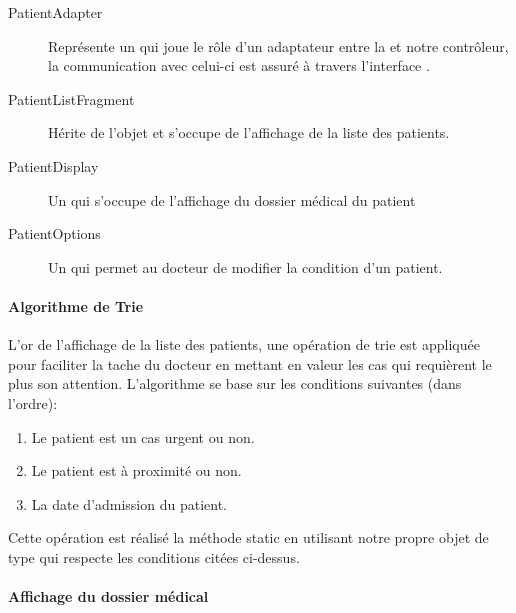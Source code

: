 \begin{description}

\item[PatientAdapter] Représente un  qui joue le rôle d'un adaptateur entre la  et notre contrôleur, la communication avec celui-ci est assuré à travers l'interface .

\item[PatientListFragment] Hérite de l'objet  et s'occupe de l'affichage de la liste des patients.

\item[PatientDisplay] Un  qui s'occupe de l'affichage du dossier médical du patient

\item[PatientOptions] Un  qui permet au docteur de modifier la condition d'un patient.

\end{description}

\paragraph{Algorithme de Trie}

L'or de l'affichage de la liste des patients, une opération de trie est appliquée pour faciliter la tache du docteur en mettant en valeur les cas qui requièrent le plus son attention.
L’algorithme se base sur les conditions suivantes (dans l'ordre):

\begin{enumerate}

\item Le patient est un cas urgent ou non.

\item Le patient est à proximité ou non.

\item La date d'admission du patient.

\end{enumerate}

Cette opération est réalisé la méthode static  en utilisant notre propre objet de type  qui respecte les conditions citées ci-dessus.


\paragraph{Affichage du dossier médical}

